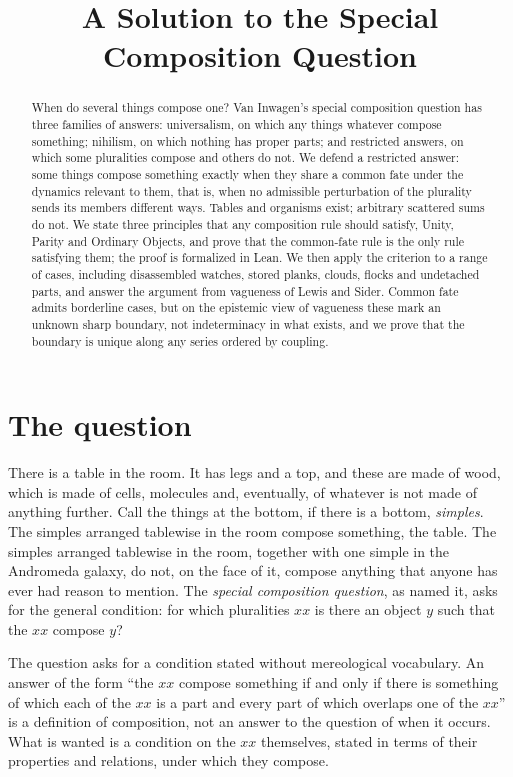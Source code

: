 \documentclass{situationist-preprint}
\title{A Solution to the Special Composition Question}
\begin{document}
\maketitle

\begin{abstract}
When do several things compose one? Van Inwagen's special composition question has three families of answers: universalism, on which any things whatever compose something; nihilism, on which nothing has proper parts; and restricted answers, on which some pluralities compose and others do not. We defend a restricted answer: some things compose something exactly when they share a common fate under the dynamics relevant to them, that is, when no admissible perturbation of the plurality sends its members different ways. Tables and organisms exist; arbitrary scattered sums do not. We state three principles that any composition rule should satisfy, Unity, Parity and Ordinary Objects, and prove that the common-fate rule is the only rule satisfying them; the proof is formalized in Lean. We then apply the criterion to a range of cases, including disassembled watches, stored planks, clouds, flocks and undetached parts, and answer the argument from vagueness of Lewis and Sider. Common fate admits borderline cases, but on the epistemic view of vagueness these mark an unknown sharp boundary, not indeterminacy in what exists, and we prove that the boundary is unique along any series ordered by coupling.
\end{abstract}

\section{The question}

There is a table in the room. It has legs and a top, and these are made of wood, which is made of cells, molecules and, eventually, of whatever is not made of anything further. Call the things at the bottom, if there is a bottom, \emph{simples}. The simples arranged tablewise in the room compose something, the table. The simples arranged tablewise in the room, together with one simple in the Andromeda galaxy, do not, on the face of it, compose anything that anyone has ever had reason to mention. The \emph{special composition question}, as \citet{vanInwagen1987,vanInwagen1990} named it, asks for the general condition: for which pluralities $xx$ is there an object $y$ such that the $xx$ compose $y$?

The question asks for a condition stated without mereological vocabulary. An answer of the form \enquote{the $xx$ compose something if and only if there is something of which each of the $xx$ is a part and every part of which overlaps one of the $xx$} is a definition of composition, not an answer to the question of when it occurs. What is wanted is a condition on the $xx$ themselves, stated in terms of their properties and relations, under which they compose.
\end{document}
